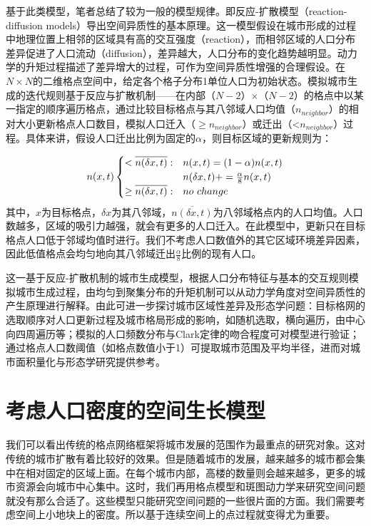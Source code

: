 基于此类模型，笔者总结了较为一般的模型规律。即反应-扩散模型（reaction-diffusion models）导出空间异质性的基本原理。这一模型假设在城市形成的过程中地理位置上相邻的区域具有高的交互强度（reaction），而相邻区域的人口分布差异促进了人口流动（diffusion），差异越大，人口分布的变化趋势越明显。动力学的升矩过程描述了差异增大的过程，可作为空间异质性增强的合理假设。在$N\times N$的二维格点空间中，给定各个格子分布1单位人口为初始状态。模拟城市生成的迭代规则基于反应与扩散机制——在内部（$N-2$）$\times$（$N-2$）的格点中以某一指定的顺序遍历格点，通过比较目标格点与其八邻域人口均值（$n_{neighbor}$）的相对大小更新格点人口数目，模拟人口迁入（$\geq n_{neighbor}$）或迁出（\textless$n_{neighbor}$）过程。具体来讲，假设人口迁出比例为固定的$\alpha$，则目标区域的更新规则为：

\begin{equation}
n(x,t) 
\begin{cases}
	<\overline{n(\delta x,t)}: & n(x,t)=(1-\alpha)n(x,t) \notag\\
	 & n(\delta x,t) += \frac{\alpha}{8}n(x,t)\notag\\
	\geq\overline{n(\delta x,t)}: & no\ change
\end{cases}
\end{equation}
其中，$x$为目标格点，$\delta x$为其八邻域，$\overline{n(\delta x,t)}$为八邻域格点内的人口均值。人口数越多，区域的吸引力越强，就会有更多的人口迁入。在此模型中，更新只在目标格点人口低于邻域均值时进行。我们不考虑人口数值外的其它区域环境差异因素，因此低值格点会均匀地向其八邻域迁出$\frac{\alpha}{8}$比例的现有人口。

这一基于反应-扩散机制的城市生成模型，根据人口分布特征与基本的交互规则模拟城市生成过程，由均匀到聚集分布的升矩机制可以从动力学角度对空间异质性的产生原理进行解释。由此可进一步探讨城市区域性差异及形态学问题：目标格网的选取顺序对人口更新过程及城市格局形成的影响，如随机选取，横向遍历，由中心向四周遍历等；模拟的人口频数分布与Clark定律的吻合程度可对模型进行验证；通过格点人口数阈值（如格点数值小于1）可提取城市范围及平均半径，进而对城市面积量化与形态学研究提供参考。


\section{考虑人口密度的空间生长模型}

我们可以看出传统的格点网络框架将城市发展的范围作为最重点的研究对象。这对传统的城市扩散有着比较好的效果。但是随着城市的发展，越来越多的城市都会集中在相对固定的区域上面。在每个城市内部，高楼的数量则会越来越多，更多的城市资源会向城市中心集中\cite{BerryThe}。这时，我们再用格点模型和斑图动力学来研究空间问题就没有那么合适了。这些模型只能研究空间问题的一些很片面的方面。我们需要考虑空间上小地块上的密度。所以基于连续空间上的点过程就变得尤为重要。


